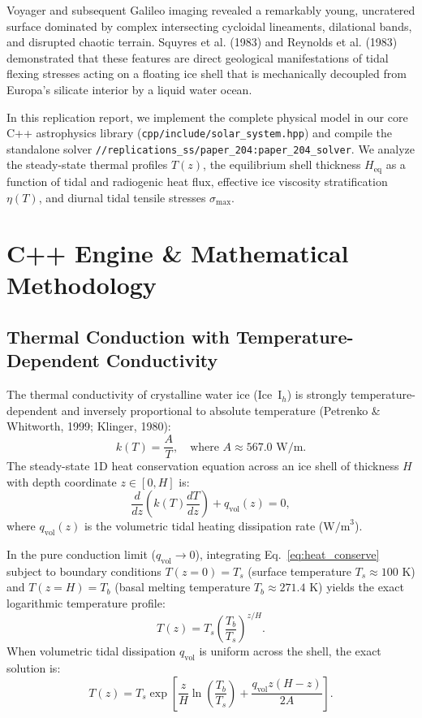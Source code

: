 \documentclass[11pt,a4paper]{article}
\begin{document}
Voyager and subsequent Galileo imaging revealed a remarkably young, uncratered surface dominated by complex intersecting cycloidal lineaments, dilational bands, and disrupted chaotic terrain. Squyres et al. (1983) and Reynolds et al. (1983) demonstrated that these features are direct geological manifestations of tidal flexing stresses acting on a floating ice shell that is mechanically decoupled from Europa's silicate interior by a liquid water ocean.

In this replication report, we implement the complete physical model in our core C++ astrophysics library (\texttt{cpp/include/solar\_system.hpp}) and compile the standalone solver \texttt{//replications\_ss/paper\_204:paper\_204\_solver}. We analyze the steady-state thermal profiles $T(z)$, the equilibrium shell thickness $H_{\text{eq}}$ as a function of tidal and radiogenic heat flux, effective ice viscosity stratification $\eta(T)$, and diurnal tidal tensile stresses $\sigma_{\text{max}}$.

\section{C++ Engine \& Mathematical Methodology}

\subsection{Thermal Conduction with Temperature-Dependent Conductivity}
The thermal conductivity of crystalline water ice (Ice~I$_h$) is strongly temperature-dependent and inversely proportional to absolute temperature (Petrenko \& Whitworth, 1999; Klinger, 1980):
\begin{equation}
k(T) = \frac{A}{T}, \quad \text{where } A \approx 567.0\text{ W/m}.
\label{eq:cond_k}
\end{equation}
The steady-state 1D heat conservation equation across an ice shell of thickness $H$ with depth coordinate $z \in [0, H]$ is:
\begin{equation}
\frac{d}{dz}\left( k(T) \frac{dT}{dz} \right) + q_{\text{vol}}(z) = 0,
\label{eq:heat_conserve}
\end{equation}
where $q_{\text{vol}}(z)$ is the volumetric tidal heating dissipation rate ($\text{W/m}^3$).

In the pure conduction limit ($q_{\text{vol}} \to 0$), integrating Eq.~\eqref{eq:heat_conserve} subject to boundary conditions $T(z=0) = T_s$ (surface temperature $T_s \approx 100\text{ K}$) and $T(z=H) = T_b$ (basal melting temperature $T_b \approx 271.4\text{ K}$) yields the exact logarithmic temperature profile:
\begin{equation}
T(z) = T_s \left( \frac{T_b}{T_s} \right)^{z / H}.
\label{eq:temp_log}
\end{equation}
When volumetric tidal dissipation $q_{\text{vol}}$ is uniform across the shell, the exact solution is:
\begin{equation}
T(z) = T_s \exp\left[ \frac{z}{H} \ln\left(\frac{T_b}{T_s}\right) + \frac{q_{\text{vol}} z (H - z)}{2 A} \right].
\label{eq:temp_vol}
\end{equation}
\end{document}
